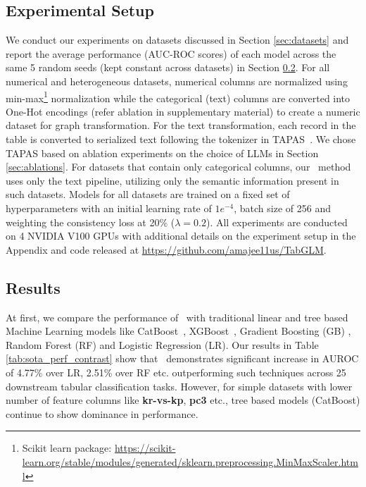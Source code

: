 \subsection{Experimental Setup}
We conduct our experiments on datasets discussed in Section \ref{sec:datasets} and report the average performance (AUC-ROC scores) of each model across the same 5 random seeds (kept constant across datasets) in Section \ref{sec:results}. 
For all numerical and heterogeneous datasets, numerical columns are normalized using min-max\footnote{Scikit learn package: \url{https://scikit-learn.org/stable/modules/generated/sklearn.preprocessing.MinMaxScaler.html}} normalization while the categorical (text) columns are converted into One-Hot encodings (refer ablation in supplementary material) to create a numeric dataset for graph transformation.
For the text transformation, each record in the table is converted to serialized text following the tokenizer in TAPAS~\cite{tapas}. We chose TAPAS based on ablation experiments on the choice of LLMs in Section \ref{sec:ablations}. 
For datasets that contain only categorical columns, our \tabglm\ method uses only the text pipeline, utilizing only the semantic information present in such datasets.
Models for all datasets are trained on a fixed set of hyperparameters with an initial learning rate of $1e^{-4}$, batch size of 256 and weighting the consistency loss at 20\% ($\lambda = 0.2$). 
All experiments are conducted on 4 NVIDIA V100 GPUs with additional details on the experiment setup in the Appendix and code released at \url{https://github.com/amajee11us/TabGLM}.



\subsection{Results}
\label{sec:results}
At first, we compare the performance of \tabglm\ with traditional linear and tree based Machine Learning models like CatBoost~\cite{prokhorenkova2018catboost}, XGBoost~\cite{chen2016xgboost}, Gradient Boosting (GB) \cite{ke2017lightgbm}, Random Forest (RF) \cite{breiman2001random} and Logistic Regression (LR).
Our results in Table \ref{tab:sota_perf_contrast} show that \tabglm\ demonstrates significant increase in AUROC of 4.77\% over LR, 2.51\% over RF etc. outperforming such techniques across 25 downstream tabular classification tasks.
However, for simple datasets with lower number of feature columns like \textbf{kr-vs-kp}, \textbf{pc3} etc., tree based models (CatBoost) continue to show dominance in performance.

